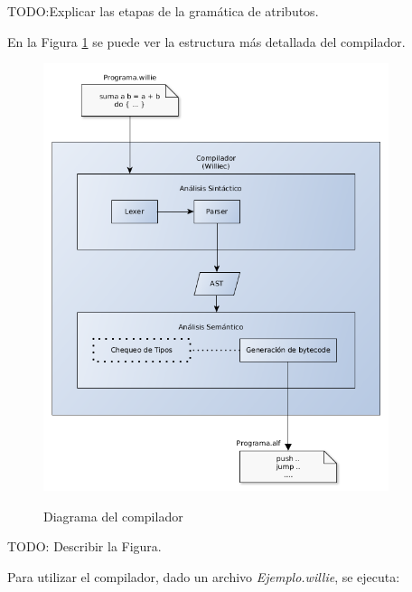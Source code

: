   TODO:Explicar las etapas de la gramática de atributos.

  En la Figura \ref{fig:compiler} se puede ver la estructura más detallada
del compilador.

\begin{figure}[h!]
\begin{center}
\caption{Diagrama del compilador}
\includegraphics[width=0.9\textwidth]{graphs/compiler.png}
\label{fig:compiler}
\end{center}
\end{figure}

  TODO: Describir la Figura.




  Para utilizar el compilador, dado un archivo \textit{Ejemplo.willie}, se
  ejecuta:

